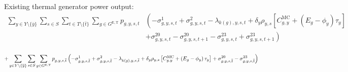 \documentclass{article}
\newcommand{\sGeneratorsExistingThermal}{G^{\mathrm{E,T}}}
\newcommand{\sStorageCandidate}{G^{\mathrm{C,Q}}}
\newcommand{\sYears}{Y}
\newcommand{\sScenarios}{S}
\newcommand{\sIntervals}{T}
\newcommand{\iGenerator}{g}
\newcommand{\iYear}{y}
\newcommand{\iYearTerminal}{\overline{\iYear}}
\newcommand{\iScenario}{s}
\newcommand{\iInterval}{t}
\newcommand{\iIntervalTerminal}{\overline{\iInterval}}
\newcommand{\iZone}{z}
\newcommand{\cFixedOperationsMaintenanceCostGenerator}[1][\iGenerator]{C^{\mathrm{FOM}}_{#1}}
\newcommand{\cScenarioDuration}[1][\iYear,\iScenario]{\rho_{#1}}
\newcommand{\cMarginalCost}[1][\iGenerator,\iYear]{C^{\mathrm{MC}}_{#1}}
\newcommand{\cEmissionsIntensity}[1][\iGenerator]{E_{#1}}
\newcommand{\cInterestRate}{i}
\newcommand{\cDiscountRate}[1][\iYear]{\delta_{#1}}
\newcommand{\vBaseline}[1][\iYear]{\phi_{#1}}
\newcommand{\vPermitPrice}[1][\iYear]{\tau_{#1}}
\newcommand{\vPower}[1][\iGenerator,\iYear,\iScenario,\iInterval]{p_{#1}}
\newcommand{\vInstalledCapacityTotal}[1][\iGenerator,\iYear]{a_{#1}}
\newcommand{\dStorageBuildLimit}[1][\iZone,\iYear]{\mu_{#1}^{4}}
\newcommand{\dTotalInstallCapacity}[1][\iGenerator,\iYear]{\nu_{#1}^{1}}
\newcommand{\dMinPowerOutput}[1][\iGenerator,\iYear,\iScenario,\iInterval]{\sigma_{#1}^{1}}
\newcommand{\dMaxPowerOutputExistingThermal}[1][\iGenerator,\iYear,\iScenario,\iInterval]{\sigma_{#1}^{2}}
\newcommand{\dMaxDischargingRateCandidate}[1][\iGenerator,\iYear,\iScenario,\iInterval]{\sigma_{#1}^{14}}
\newcommand{\dRampRateUp}[1][\iGenerator,\iYear,\iScenario,\iInterval]{\sigma_{#1}^{20}}
\newcommand{\dRampRateDown}[1][\iGenerator,\iYear,\iScenario,\iInterval]{\sigma_{#1}^{23}}
\newcommand{\dPowerBalance}[1][\iZone,\iYear,\iScenario,\iInterval]{\lambda_{#1}}
\begin{document}

Existing thermal generator power output:
\begin{align}
	\sum\limits_{\iYear \in \sYears 
		\setminus \{\iYearTerminal\}
	}\sum\limits_{\iScenario \in \sScenarios}\sum\limits_{\iInterval \in \sIntervals \setminus \{\iIntervalTerminal\}} \sum\limits_{\iGenerator \in \sGeneratorsExistingThermal} \vPower &\left( -\dMinPowerOutput + \dMaxPowerOutputExistingThermal 
	- \dPowerBalance[k(\iGenerator),\iYear,\iScenario,\iInterval] + \cDiscountRate \cScenarioDuration \left[\cMarginalCost + \left(\cEmissionsIntensity - \vBaseline\right)\vPermitPrice \right] \right. \nonumber\\
	& \left. + \dRampRateUp - \dRampRateUp[\iGenerator,\iYear,\iScenario,\iInterval + 1] - \dRampRateDown + \dRampRateDown[\iGenerator,\iYear,\iScenario,\iInterval + 1]
	\right)\\\nonumber
\end{align}

\begin{equation}
	+ \sum\limits_{\iYear \in \sYears 
		\setminus \{\iYearTerminal\}
	}\sum\limits_{\iScenario \in \sScenarios} \sum\limits_{\iGenerator \in \sGeneratorsExistingThermal} \vPower[\iGenerator,\iYear,\iScenario,\iIntervalTerminal] \left(-\dMinPowerOutput[\iGenerator,\iYear,\iScenario,\iIntervalTerminal] + \dMaxPowerOutputExistingThermal[\iGenerator,\iYear,\iScenario,\iIntervalTerminal] 
	- \dPowerBalance[k(\iGenerator),\iYear,\iScenario,\iIntervalTerminal] + \cDiscountRate \cScenarioDuration \left[\cMarginalCost + \left(\cEmissionsIntensity - \vBaseline\right)\vPermitPrice \right] + \dRampRateUp[\iGenerator,\iYear,\iScenario,\iIntervalTerminal] - \dRampRateDown[\iGenerator,\iYear,\iScenario,\iIntervalTerminal] \right)\\
\end{equation}
\end{document}
